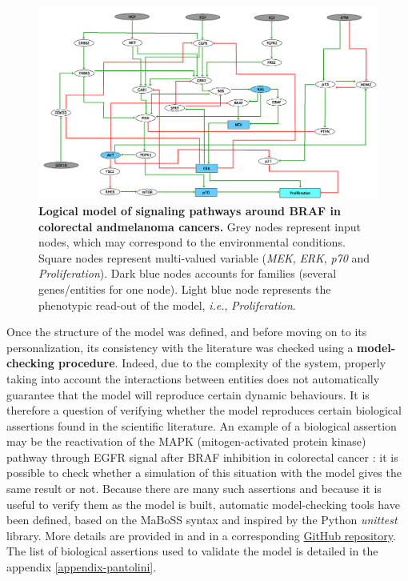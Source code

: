\documentclass[a4paper,12pt,twoside,onecolumn,openright,final,oldfontcommands]{memoir}
\begin{document}
\begin{figure}

{\centering \includegraphics[width=0.9\linewidth]{fig/BRAF-model} 

}

\caption[Logical model of signaling pathways around BRAF in colorectal and melanoma cancers]{\textbf{Logical model of signaling pathways
around BRAF in colorectal andmelanoma cancers.} Grey nodes represent
input nodes, which may correspond to the environmental conditions.
Square nodes represent multi-valued variable (\emph{MEK}, \emph{ERK},
\emph{p70} and \emph{Proliferation}). Dark blue nodes accounts for
families (several genes/entities for one node). Light blue node
represents the phenotypic read-out of the model, \emph{i.e.},
\emph{Proliferation}.}\label{fig:BRAF-model}
\end{figure}










Once the structure of the model was defined, and before moving on to its
personalization, its consistency with the literature was checked using a
\textbf{model-checking procedure}. Indeed, due to the complexity of the
system, properly taking into account the interactions between entities
does not automatically guarantee that the model will reproduce certain
dynamic behaviours. It is therefore a question of verifying whether the
model reproduces certain biological assertions found in the scientific
literature. An example of a biological assertion may be the reactivation
of the MAPK (mitogen-activated protein kinase) pathway through EGFR
signal after BRAF inhibition in colorectal cancer
\citep{prahallad2012unresponsiveness}: it is possible to check whether a
simulation of this situation with the model gives the same result or
not. Because there are many such assertions and because it is useful to
verify them as the model is built, automatic model-checking tools have
been defined, based on the MaBoSS syntax and inspired by the Python
\emph{unittest} library. More details are provided in
\citet{beal2020personalized} and in a corresponding
\href{https://github.com/sysbio-curie/MaBoSS_test}{GitHub repository}.
The list of biological assertions used to validate the model is detailed
in the appendix \ref{appendix-pantolini}.
\end{document}

